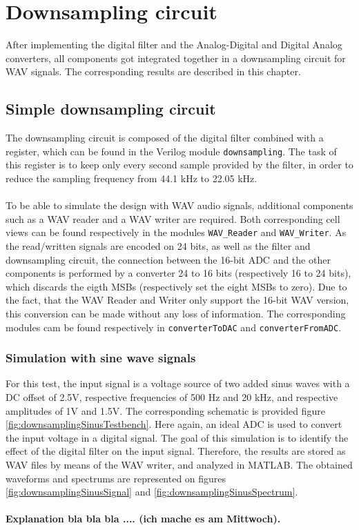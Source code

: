 \chapter{Downsampling circuit}

After implementing the digital filter and the Analog-Digital and Digital Analog converters, all components got integrated together in a downsampling circuit for WAV signals. The corresponding results are described in this chapter.

\section{Simple downsampling circuit}

The downsampling circuit is composed of the digital filter combined with a register, which can be found in the Verilog module \texttt{downsampling}. The task of this register is to keep only every second sample provided by the filter, in order to reduce the sampling frequency from 44.1 kHz to 22.05 kHz.\\
\\
To be able to simulate the design with WAV audio signals, additional components such as a WAV reader and a WAV writer are required. Both corresponding cell views can be found respectively in the modules \texttt{WAV\_Reader} and \texttt{WAV\_Writer}. As the read/written signals are encoded on 24 bits, as well as the filter and downsampling circuit, the connection between the 16-bit ADC and the other components is performed by a converter 24 to 16 bits (respectively 16 to 24 bits), which discards the eigth MSBs (respectively set the eight MSBs to zero). Due to the fact, that the WAV Reader and Writer only support the 16-bit WAV version, this conversion can be made without any loss of information. The corresponding modules cam be found respectively in \texttt{converterToDAC} and \texttt{converterFromADC}. 

\subsection{Simulation with sine wave signals}

For this test, the input signal is a voltage source of two added sinus waves with a DC offset of 2.5V, respective frequencies of 500 Hz and 20 kHz, and respective amplitudes of 1V and 1.5V. The corresponding schematic is provided figure \ref{fig:downsamplingSinusTestbench}. Here again, an ideal ADC is used to convert the input voltage in a digital signal. The goal of this simulation is to identify the effect of the digital filter on the input signal. Therefore, the results are stored as WAV files by means of the WAV writer, and analyzed in MATLAB. The obtained waveforms and spectrums are represented on figures \ref{fig:downsamplingSinusSignal} and \ref{fig:downsamplingSinusSpectrum}.\\
\\
\textbf{Explanation bla bla bla .... (ich mache es am Mittwoch).}


